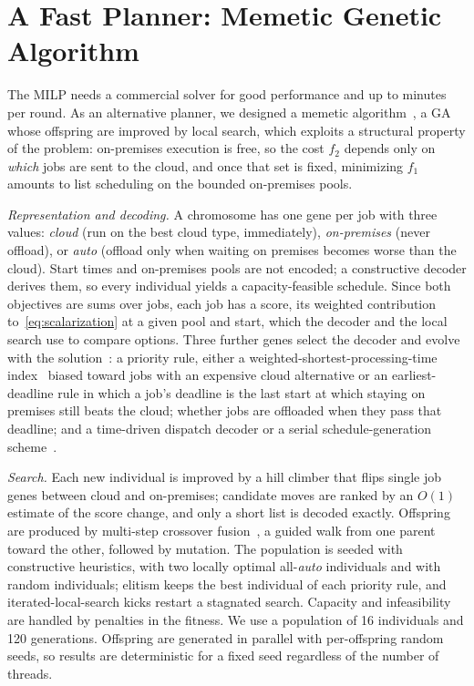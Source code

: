 \documentclass[conference]{IEEEtran}
\begin{document}
\section{A Fast Planner: Memetic Genetic Algorithm}
\label{sec:ga}

The MILP needs a commercial solver for good performance and up to minutes per round. As an alternative planner, we designed a memetic algorithm~\cite{Moscato1989}, a GA whose offspring are improved by local search, which exploits a structural property of the problem: on-premises execution is free, so the cost $f_2$ depends only on \emph{which} jobs are sent to the cloud, and once that set is fixed, minimizing $f_1$ amounts to list scheduling on the bounded on-premises pools.

\emph{Representation and decoding.} A chromosome has one gene per job with three values: \emph{cloud} (run on the best cloud type, immediately), \emph{on-premises} (never offload), or \emph{auto} (offload only when waiting on premises becomes worse than the cloud). Start times and on-premises pools are not encoded; a constructive decoder derives them, so every individual yields a capacity-feasible schedule. Since both objectives are sums over jobs, each job has a score, its weighted contribution to~\eqref{eq:scalarization} at a given pool and start, which the decoder and the local search use to compare options. Three further genes select the decoder and evolve with the solution~\cite{Eiben1999}: a priority rule, either a weighted-shortest-processing-time index~\cite{Smith1956} biased toward jobs with an expensive cloud alternative or an earliest-deadline rule in which a job's deadline is the last start at which staying on premises still beats the cloud; whether jobs are offloaded when they pass that deadline; and a time-driven dispatch decoder or a serial schedule-generation scheme~\cite{Kolisch1996}.

\emph{Search.} Each new individual is improved by a hill climber that flips single job genes between cloud and on-premises; candidate moves are ranked by an $O(1)$ estimate of the score change, and only a short list is decoded exactly. Offspring are produced by multi-step crossover fusion~\cite{Yamada1996}, a guided walk from one parent toward the other, followed by mutation. The population is seeded with constructive heuristics, with two locally optimal all-\emph{auto} individuals and with random individuals; elitism keeps the best individual of each priority rule, and iterated-local-search kicks restart a stagnated search. Capacity and infeasibility are handled by penalties in the fitness. We use a population of 16 individuals and 120 generations. Offspring are generated in parallel with per-offspring random seeds, so results are deterministic for a fixed seed regardless of the number of threads. 
\end{document}
